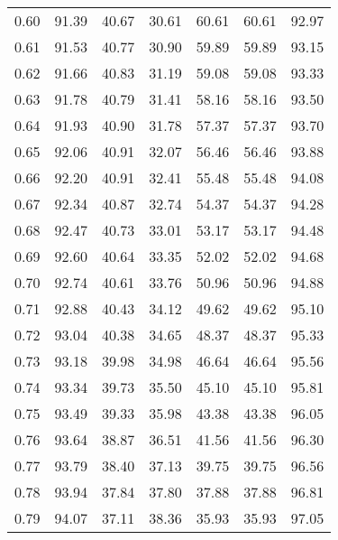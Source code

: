 \begin{tabular}{|c|c|c|c|c|c|c|}
      0.60 &     91.39 &     40.67 &      30.61 &   60.61 &      60.61 &         92.97 \\
      0.61 &     91.53 &     40.77 &      30.90 &   59.89 &      59.89 &         93.15 \\
      0.62 &     91.66 &     40.83 &      31.19 &   59.08 &      59.08 &         93.33 \\
      0.63 &     91.78 &     40.79 &      31.41 &   58.16 &      58.16 &         93.50 \\
      0.64 &     91.93 &     40.90 &      31.78 &   57.37 &      57.37 &         93.70 \\
      0.65 &     92.06 &     40.91 &      32.07 &   56.46 &      56.46 &         93.88 \\
      0.66 &     92.20 &     40.91 &      32.41 &   55.48 &      55.48 &         94.08 \\
      0.67 &     92.34 &     40.87 &      32.74 &   54.37 &      54.37 &         94.28 \\
      0.68 &     92.47 &     40.73 &      33.01 &   53.17 &      53.17 &         94.48 \\
      0.69 &     92.60 &     40.64 &      33.35 &   52.02 &      52.02 &         94.68 \\
      0.70 &     92.74 &     40.61 &      33.76 &   50.96 &      50.96 &         94.88 \\
      0.71 &     92.88 &     40.43 &      34.12 &   49.62 &      49.62 &         95.10 \\
      0.72 &     93.04 &     40.38 &      34.65 &   48.37 &      48.37 &         95.33 \\
      0.73 &     93.18 &     39.98 &      34.98 &   46.64 &      46.64 &         95.56 \\
      0.74 &     93.34 &     39.73 &      35.50 &   45.10 &      45.10 &         95.81 \\
      0.75 &     93.49 &     39.33 &      35.98 &   43.38 &      43.38 &         96.05 \\
      0.76 &     93.64 &     38.87 &      36.51 &   41.56 &      41.56 &         96.30 \\
      0.77 &     93.79 &     38.40 &      37.13 &   39.75 &      39.75 &         96.56 \\
      0.78 &     93.94 &     37.84 &      37.80 &   37.88 &      37.88 &         96.81 \\
      0.79 &     94.07 &     37.11 &      38.36 &   35.93 &      35.93 &         97.05 \\

\end{tabular}
